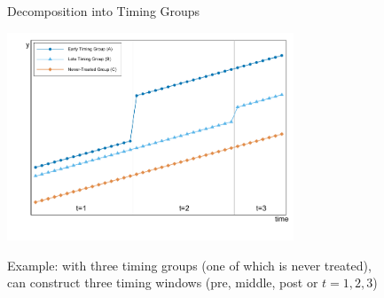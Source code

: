 \documentclass[10pt,xcolor=table,ignorenonframetext,handout,aspectratio=169]{beamer}
\begin{document}
\newpage
\begin{frame}{Decomposition into Timing Groups}

\medskip
\begin{center}
\includegraphics[width=0.64\textwidth]{fig/GBsummary2.pdf} 
\end{center}

\medskip
Example:  with three timing groups (one of which is never treated), \\
can construct three timing windows (pre, middle, post or $t = 1,2,3$)

\end{frame}


\end{document}
